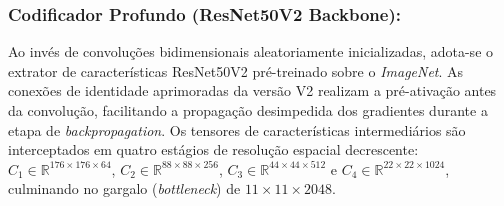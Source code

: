 \subsubsection{Codificador Profundo (ResNet50V2 Backbone):}
Ao inv\'{e}s de convolu\c{c}\~{o}es bidimensionais aleatoriamente inicializadas, adota-se o extrator de caracter\'{i}sticas ResNet50V2 \cite{he2016identity} pr\'{e}-treinado sobre o \textit{ImageNet}. As conex\~{o}es de identidade aprimoradas da vers\~{a}o V2 realizam a pr\'{e}-ativa\c{c}\~{a}o antes da convolu\c{c}\~{a}o, facilitando a propaga\c{c}\~{a}o desimpedida dos gradientes durante a etapa de \textit{backpropagation}. Os tensores de caracter\'{i}sticas intermedi\'{a}rios s\~{a}o interceptados em quatro est\'{a}gios de resolu\c{c}\~{a}o espacial decrescente:
$C_1 \in \mathbb{R}^{176 \times 176 \times 64}$, $C_2 \in \mathbb{R}^{88 \times 88 \times 256}$, $C_3 \in \mathbb{R}^{44 \times 44 \times 512}$ e $C_4 \in \mathbb{R}^{22 \times 22 \times 1024}$, culminando no gargalo (\textit{bottleneck}) de $11 \times 11 \times 2048$.

